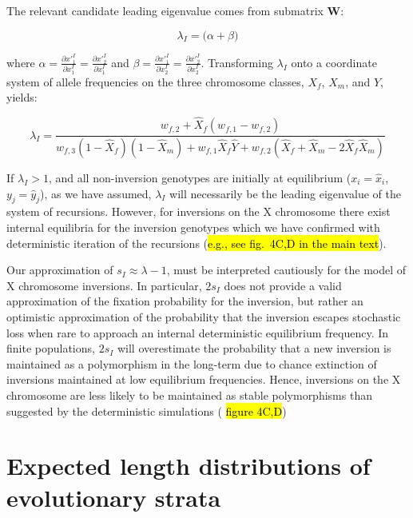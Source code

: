 \documentclass[11pt]{article}
\begin{document}
\noindent The relevant candidate leading eigenvalue comes from submatrix $\mathbf{W}$:

\begin{equation}
	\lambda_{I} = \big( \alpha + \beta \big)
\end{equation}

where $\alpha = \frac{\partial x'^I_1}{\partial x^I_1} = \frac{\partial x'^I_{2}}{\partial x^I_1}$ and $\beta = \frac{\partial x'^I_1}{\partial x^I_2} = \frac{\partial x'^I_{2}}{\partial x^I_2}$. Transforming $\lambda_I$ onto a coordinate system of allele frequencies on the three chromosome classes, $X_f$, $X_m$, and $Y$, yields:


\begin{equation}
	\lambda_I = \frac{w_{f,2} + \hat{X}_f(w_{f,1} - w_{f,2})} {w_{f,3}(1 - \hat{X}_f)(1 - \hat{X}_m) + w_{f,1} \hat{X}_f \hat{Y} + w_{f,2} (\hat{X}_f + \hat{X}_m - 2 \hat{X}_f \hat{X}_m)}
\end{equation}

\noindent If $\lambda_I > 1$, and all non-inversion genotypes are initially at equilibrium ($x_i = \hat{x}_i$, $y_j = \hat{y}_j$), as we have assumed, $\lambda_I$ will necessarily be the leading eigenvalue of the system of recursions. However, for inversions on the X chromosome there exist internal equilibria for the inversion genotypes which we have confirmed with deterministic iteration of the recursions (\hl{e.g., see fig.~4C,D in the main text}). 

Our approximation of $s_I \approx \lambda - 1$, must be interpreted cautiously for the model of X chromosome inversions. In particular, $2 s_I$ does not provide a valid approximation of the fixation probability for the inversion, but rather an optimistic approximation of the probability that the inversion escapes stochastic loss when rare to approach an internal deterministic equilibrium frequency. In finite populations, $2 s_I$ will overestimate the probability that a new inversion is maintained as a polymorphism in the long-term due to chance extinction of inversions maintained at low equilibrium frequencies. Hence, inversions on the X chromosome are less likely to be maintained as stable polymorphisms than suggested by the deterministic simulations (\hl{ figure 4C,D})

\newpage



 \section{Expected length distributions of evolutionary strata} \label{AppC:DistFixedInv}
 \renewcommand{\theequation}{C\arabic{equation}}
 \setcounter{equation}{0}
 \renewcommand{\thefigure}{C\arabic{figure}}
 \setcounter{figure}{0}
\end{document}
